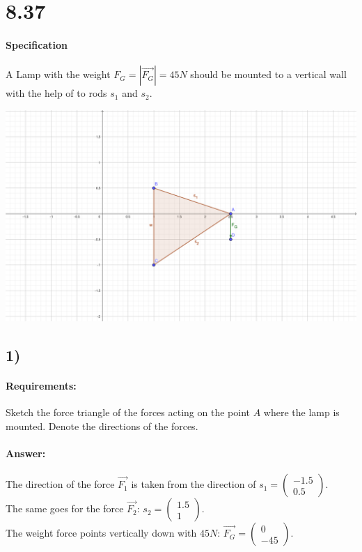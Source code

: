 \section{8.37}

\paragraph{Specification}
A Lamp with the weight $F_G = |\vec{F_G}| = 45 N$ should be mounted to a vertical wall with 
the help of to rods $s_1$ and $s_2$.

\includegraphics[width=\linewidth]{images/8-37-1.png}

\subsection{1)}
\paragraph{Requirements:}
Sketch the force triangle of the forces acting on the point $A$ where the lamp is mounted.
Denote the directions of the forces.

\paragraph{Answer:}
The direction of the force $\vec{F_1}$ is taken from the direction of $s_1 = \begin{pmatrix}
   -1.5 \\ 
   0.5
\end{pmatrix}$. \\
The same goes for the force $\vec{F_2}$: $s_2 = \begin{pmatrix}
   1.5 \\ 
   1
\end{pmatrix}$. \\
The weight force points vertically down with $45 N$: $\vec{F_G} = \begin{pmatrix}
   0 \\ 
   -45
\end{pmatrix}$.

